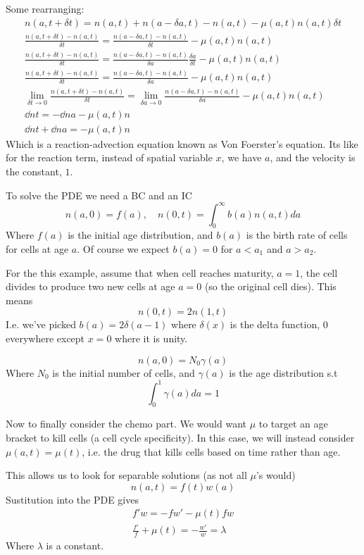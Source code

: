 \documentclass{X:/Documents/Coding/Latex/myassignment}
\begin{document}
Some rearranging:
\begin{align*}
	n(a, t+ \delta t) = n(a,t) + n(a- \delta a,t ) - n(a,t) - \mu(a,t) n(a,t) \delta t\\
	\frac{n(a, t+ \delta t) - n(a,t)}{\delta t} = \frac{n(a- \delta a,t ) - n(a,t)}{\delta t} - \mu(a,t) n(a,t)\\
	\frac{n(a, t+ \delta t) - n(a,t)}{\delta t} = \frac{n(a- \delta a,t ) - n(a,t)}{\delta a}\frac{\delta a}{\delta t} - \mu(a,t) n(a,t)\\
	\frac{n(a, t+ \delta t) - n(a,t)}{\delta t} = \frac{n(a- \delta a,t ) - n(a,t)}{\delta a} - \mu(a,t) n(a,t)\\
	\lim_{\delta t \to 0} \frac{n(a, t+ \delta t) - n(a,t)}{\delta t} =\lim_{\delta a \to 0} \frac{n(a- \delta a,t ) - n(a,t)}{\delta a} - \mu(a,t) n(a,t) \\
	\dd nt = - \dd n a - \mu(a,t) n\\
	\dd nt + \dd na = -\mu(a,t) n
\end{align*}
Which is a reaction-advection equation known as Von Foerster's equation.
Its like for the reaction term, instead of spatial variable $x$, we have $a$, and the velocity is the constant, $1$.

To solve the PDE we need a BC and an IC
\[n(a,0) = f(a), \quad n(0,t) = \int_0^\infty b(a) n(a,t) da\]
Where $f(a)$ is the initial age distribution, and $b(a)$ is the birth rate of cells for cells at age $a$. Of course we expect $b(a) = 0$ for $a < a_1$ and $a> a_2$.

For the this example, assume that when cell reaches maturity, $a = 1$, the cell divides to produce two new cells at age $a=0$ (so the original cell dies).
This means
\[n(0,t) = 2 n(1,t)\]
I.e. we've picked $b(a) = 2 \delta(a-1)$ where $\delta(x)$ is the delta function, $0$ everywhere except $x=0$ where it is unity.

\[n(a,0) = N_0 \gamma(a)\]
Where $N_0$ is the initial number of cells, and $\gamma(a)$ is the age distribution s.t
\[\int_0^1 \gamma(a) da = 1\]

Now to finally consider the chemo part. We would want $\mu$ to target an age bracket to kill cells (a cell cycle specificity). In this case, we will instead consider $\mu(a,t) = \mu(t)$, i.e. the drug that kills cells based on time rather than age.

This allows us to look for separable solutions (as not all $\mu$'s would)
\[n(a,t) = f(t) w(a)\]
Sustitution into the PDE gives
\begin{align*}
	f'w = -fw' - \mu(t) fw\\
	\frac{f'}{f} + \mu(t) = -\frac{w'}{w} =\lambda 
\end{align*}
Where $\lambda$ is a constant.
\end{document}
